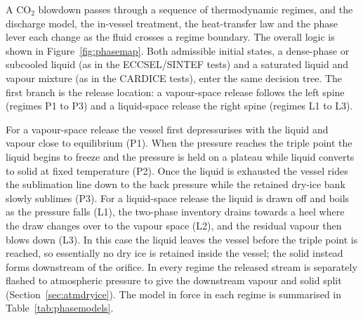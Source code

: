 \documentclass[5p,authoryear]{elsarticle}
\begin{document}
A CO$_2$ blowdown passes through a sequence of thermodynamic regimes, and the discharge model, the
in-vessel treatment, the heat-transfer law and the phase lever each change as the fluid crosses a
regime boundary. The overall logic is shown in Figure~\ref{fig:phasemap}. Both admissible initial
states, a dense-phase or subcooled liquid (as in the ECCSEL/SINTEF tests) and a saturated liquid and
vapour mixture (as in the CARDICE tests), enter the same decision tree. The first branch is the
release location: a vapour-space release follows the left spine (regimes P1 to P3) and a
liquid-space release the right spine (regimes L1 to L3).

For a vapour-space release the vessel first depressurises with the liquid and vapour close to
equilibrium (P1). When the pressure reaches the triple point the liquid begins to freeze and the
pressure is held on a plateau while liquid converts to solid at fixed temperature (P2). Once the
liquid is exhausted the vessel rides the sublimation line down to the back pressure while the
retained dry-ice bank slowly sublimes (P3). For a liquid-space release the liquid is drawn off and
boils as the pressure falls (L1), the two-phase inventory drains towards a heel where the draw
changes over to the vapour space (L2), and the residual vapour then blows down (L3). In this case
the liquid leaves the vessel before the triple point is reached, so essentially no dry ice is
retained inside the vessel; the solid instead forms downstream of the orifice. In every regime the
released stream is separately flashed to atmospheric pressure to give the downstream vapour and
solid split (Section~\ref{sec:atmdryice}). The model in force in each regime is summarised in
Table~\ref{tab:phasemodels}.
\end{document}
